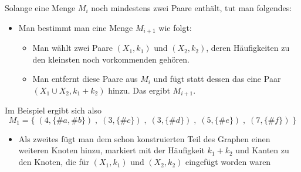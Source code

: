 Solange eine Menge $M_i$ noch mindestens zwei Paare enthält, tut man folgendes:
\begin{itemize}
\item Man bestimmt man eine Menge $M_{i+1}$ wie folgt:
  \begin{itemize}
  \item Man wählt zwei Paare $(X_1,k_1)$ und $(X_2,k_2)$, deren
    Häufigkeiten zu den kleinsten noch vorkommenden gehören.
  \item Man entfernt diese Paare aus $M_i$ und fügt statt dessen das
    eine Paar $(X_1\cup X_2, k_1+k_2)$ hinzu. Das ergibt $M_{i+1}$.
  \end{itemize}
\end{itemize}
Im Beispiel ergibt sich also
\[
M_1= \{ \;(4,\{\#a,\#b\})\;, \;(3,\{\#c\})\;, \;(3,\{\#d\})\;, \;(5,\{\#e\})\;, \;(7,\{\#f\})\; \}
\]
\begin{itemize}
\item Als zweites fügt man dem schon konstruierten Teil des Graphen
  einen weiteren Knoten hinzu, markiert mit der Häufigkeit $k_1+k_2$
  und Kanten zu den Knoten, die für $(X_1,k_1)$ und $(X_2,k_2)$
  eingefügt worden waren
\end{itemize}

